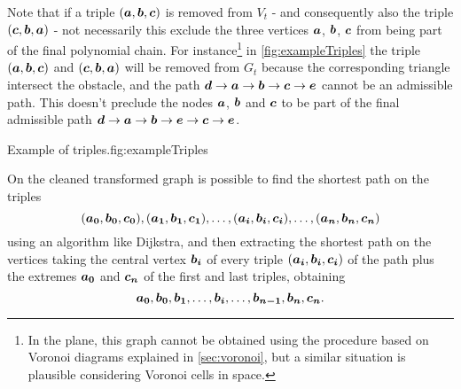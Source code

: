 \documentclass[dissertation.tex]{subfiles}
\begin{document}
Note that if a triple $(\boldsymbol{a},\boldsymbol{b},\boldsymbol{c})$ is removed from $V_t$ - and
consequently also the triple $(\boldsymbol{c},\boldsymbol{b},\boldsymbol{a})$ - not necessarily this exclude
the three vertices $\boldsymbol{a}$, $\boldsymbol{b}$, $\boldsymbol{c}$ from being part of the final
polynomial chain. For instance\footnote{In the plane, this graph cannot be
  obtained using the procedure based on Voronoi diagrams explained in
  \cref{sec:voronoi}, but a similar situation is plausible
  considering Voronoi cells in space.} in
\cref{fig:exampleTriples} the triple
$(\boldsymbol{a},\boldsymbol{b},\boldsymbol{c})$ and $(\boldsymbol{c},\boldsymbol{b},\boldsymbol{a})$ will be removed from $G_t$ because
the corresponding triangle intersect the obstacle, and the path
$\boldsymbol{d}\rightarrow \boldsymbol{a}\rightarrow \boldsymbol{b}\rightarrow \boldsymbol{c}\rightarrow \boldsymbol{e}$ cannot be an
admissible path. This doesn't preclude the nodes $\boldsymbol{a}$, $\boldsymbol{b}$ and $\boldsymbol{c}$ to be part
of the final admissible path $\boldsymbol{d}\rightarrow \boldsymbol{a}\rightarrow \boldsymbol{b}\rightarrow \boldsymbol{e}\rightarrow \boldsymbol{c}\rightarrow \boldsymbol{e}$.
\begin{myfig}{Example of triples.}{fig:exampleTriples}
\end{myfig}

On the cleaned transformed graph is possible to find the shortest path on the
triples
$$
(\boldsymbol{a_0},\boldsymbol{b_0},\boldsymbol{c_0}), (\boldsymbol{a_1},\boldsymbol{b_1},\boldsymbol{c_1}),\dots,(\boldsymbol{a_i},\boldsymbol{b_i},\boldsymbol{c_i}),\dots,(\boldsymbol{a_n},\boldsymbol{b_n},\boldsymbol{c_n})
$$
 using
an algorithm like Dijkstra, and then extracting the shortest
path on the vertices taking the central vertex $\boldsymbol{b_i}$ of every
triple $(\boldsymbol{a_i},\boldsymbol{b_i},\boldsymbol{c_i})$ of the path plus the extremes $\boldsymbol{a_0}$ and $\boldsymbol{c_n}$
of the first and last triples, obtaining
$$
\boldsymbol{a_0},\boldsymbol{b_0},\boldsymbol{b_1},\dots,\boldsymbol{b_i},\dots,\boldsymbol{b_{n-1}},\boldsymbol{b_n},\boldsymbol{c_n}.
$$
\end{document}
